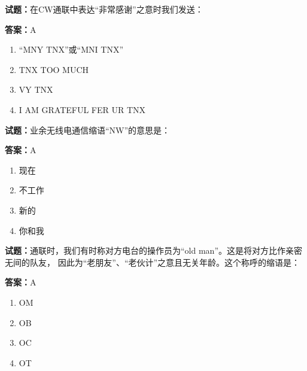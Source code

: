 \documentclass{ctexbook}
\begin{document}




\vspace{1em}

\textbf{试题：}在CW通联中表达“非常感谢”之意时我们发送： 

\textbf{答案：}A 

\begin{enumerate}[leftmargin=3em]
  \item “MNY TNX”或“MNI TNX” 

  \item TNX TOO MUCH 

  \item VY TNX 

  \item I AM GRATEFUL FER UR TNX 

\end{enumerate}





\vspace{1em}

\textbf{试题：}业余无线电通信缩语“NW”的意思是： 

\textbf{答案：}A 

\begin{enumerate}[leftmargin=3em]
  \item 现在 

  \item 不工作 

  \item 新的 

  \item 你和我 

\end{enumerate}





\vspace{1em}

\textbf{试题：}通联时，我们有时称对方电台的操作员为“old man”。这是将对方比作亲密无间的队友，
因此为“老朋友”、“老伙计”之意且无关年龄。这个称呼的缩语是： 

\textbf{答案：}A 

\begin{enumerate}[leftmargin=3em]
  \item OM 

  \item OB 


  \item OC 

  \item OT 

\end{enumerate}
\end{document}
